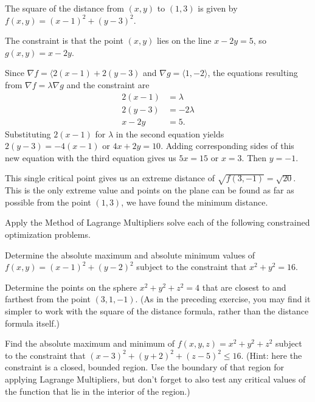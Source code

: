 \begin{exercises}
    \ea

\begin{exerciseSolution}
  \ba
  \item The square of the distance from $(x,y)$ to $(1,3)$ is given by $f(x,y) = (x-1)^2 + (y-3)^2$.
  \item The constraint is that the point $(x,y)$ lies on the line $x-2y=5$, so $g(x,y) = x-2y$. 
  \item Since $\nabla f = \langle 2(x-1) + 2(y-3)$ and $\nabla g = \langle 1, -2 \rangle$, the equations resulting from $\nabla f = \lambda \nabla
    g$ and the constraint are 
\begin{align*}
2(x-1) &= \lambda \\
2(y-3) &= -2\lambda \\
x-2y &= 5.
\end{align*}
Substituting $2(x-1)$ for $\lambda$ in the second equation yields $2(y-3) = -4(x-1)$ or $4x+2y=10$. Adding corresponding sides of this new equation with the third equation gives us $5x = 15$ or $x=3$. Then $y = -1$. 
  \item This single critical point gives us an extreme distance of $\sqrt{f(3,-1)} = \sqrt{20}$. This is the only extreme value and points on the plane can be found as far as possible from the point $(1,3)$, we have found the minimum distance.

    \ea
\end{exerciseSolution}

\item Apply the Method of Lagrange Multipliers solve each of the following constrained optimization problems.
	\ba
		\item Determine the absolute maximum and absolute minimum values of $f(x,y) = (x-1)^2 + (y-2)^2$ subject to the constraint that $x^2 + y^2 = 16$. 
		\item Determine the points on the sphere $x^2 + y^2 + z^2 = 4$ that are closest to and farthest from the point $(3,1,-1)$.  (As in the preceding exercise, you may find it simpler to work with the square of the distance formula, rather than the distance formula itself.)
		\item Find the absolute maximum and minimum of $f(x,y,z) = x^2 + y^2 + z^2$ subject to the constraint that $(x-3)^2 + (y+2)^2 + (z-5)^2 \le 16$.  (Hint: here the constraint is a closed, bounded region.  Use the boundary of that region for applying Lagrange Multipliers, but don't forget to also test any critical values of the function that lie in the interior of the region.)
	\ea	
 

\end{exercises}
